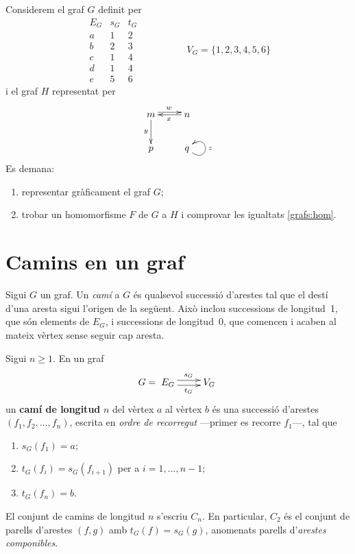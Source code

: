 \begin{exercici}
Considerem el graf $G$ definit per
\[
    \begin{array}{c|c|c}
        E_G & s_G & t_G \\ \hline
        a & 1 & 2 \\
        b & 2 & 3 \\
        c & 1 & 4 \\
        d & 1 & 4 \\
        e & 5 & 6 
    \end{array}
    \hspace{2cm} V_G=\{1,2,3,4,5,6\}
\]
i el graf $H$ representat per
\[
\xymatrix{
	m \ar[d]_{y} \ar@<0.6ex>[r]^{w} & n \ar[l]^{x} \\
	p  & q \ar@(dr,ur)_{z}
}
\]
Es demana:
\begin{enumerate}
\item representar gràficament el graf $G$;
\item trobar un homomorfisme $F$ de $G$ a $H$ i comprovar les igualtats \eqref{grafs:hom}.
\end{enumerate}
\end{exercici}

\section{Camins en un graf}

Sigui $G$ un graf. Un \emph{camí} a $G$ és qualsevol successió d'arestes tal que el destí d'una aresta sigui l'origen de la següent. Això inclou successions de longitud~1, que són elements de $E_G$, i successions de longitud~0, que comencen i acaben al mateix vèrtex sense seguir cap aresta.

\begin{definicio}
Sigui $n\geq 1$. En un graf
\[
G=\xymatrix{
E_G \ar@<0.6ex>[r]^{s_G} \ar@<-0.6ex>[r]_{t_G} & V_G
}
\]
un \textbf{camí de longitud} $n$ del vèrtex $a$ al vèrtex $b$ és una successió d'arestes $(f_1,f_2,\dots,f_n)$, escrita en \emph{ordre de recorregut} ---primer es recorre $f_1$---, tal que
\begin{enumerate}
\item[(i)] $s_G(f_1)=a$;
\item[(ii)] $t_G(f_i)=s_G(f_{i+1})$ per a $i=1,\dots,n-1$;
\item[(iii)] $t_G(f_n)=b$.
\end{enumerate}
El conjunt de camins de longitud $n$ s'escriu $C_n$. En particular, $C_2$ és el conjunt de parells d'arestes $(f,g)$ amb $t_G(f)=s_G(g)$, anomenats parells d'\emph{arestes componibles}.
\end{definicio}

